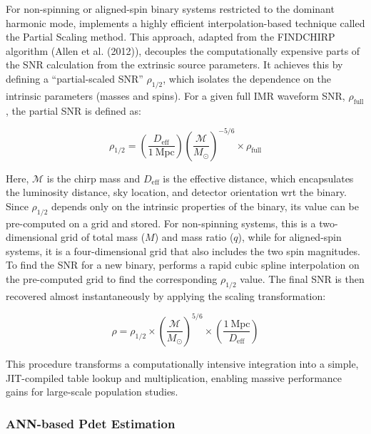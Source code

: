 \documentclass[10pt,a4paper,onecolumn]{article}
\let\textttOrig=\texttt
\def\texttt#1{\expandafter\textttOrig{\seqsplit{#1}}}
\begin{document}
For non-spinning or aligned-spin binary systems restricted to the
dominant harmonic mode, \texttt{gwsnr} implements a highly efficient
interpolation-based technique called the Partial Scaling method. This
approach, adapted from the FINDCHIRP algorithm (Allen et al. (2012)),
decouples the computationally expensive parts of the SNR calculation
from the extrinsic source parameters. It achieves this by defining a
``partial-scaled SNR'' \(\rho_{1/2}\), which isolates the dependence on
the intrinsic parameters (masses and spins). For a given full IMR
waveform SNR, \(\rho_{\text{full}}\), the partial SNR is defined as:

\[
\rho_{1/2} = \left(\frac{D_\mathrm{eff}}{1~\mathrm{Mpc}}\right) \left(\frac{\mathcal{M}}{M_\odot}\right)^{-5/6} \times \rho_{\text{full}}
\]

Here, \(\mathcal{M}\) is the chirp mass and \(D_{\text{eff}}\) is the
effective distance, which encapsulates the luminosity distance, sky
location, and detector orientation wrt the binary. Since \(\rho_{1/2}\)
depends only on the intrinsic properties of the binary, its value can be
pre-computed on a grid and stored. For non-spinning systems, this is a
two-dimensional grid of total mass (\(M\)) and mass ratio (\(q\)), while
for aligned-spin systems, it is a four-dimensional grid that also
includes the two spin magnitudes. To find the SNR for a new binary,
\texttt{gwsnr} performs a rapid cubic spline interpolation on the
pre-computed grid to find the corresponding \(\rho_{1/2}\) value. The
final SNR is then recovered almost instantaneously by applying the
scaling transformation:

\[
\rho = \rho_{1/2} \times \left(\frac{\mathcal{M}}{M_\odot}\right)^{5/6} \times \left(\frac{1~\mathrm{Mpc}}{D_\mathrm{eff}}\right)
\]

This procedure transforms a computationally intensive integration into a
simple, JIT-compiled table lookup and multiplication, enabling massive
performance gains for large-scale population studies.

\subsubsection{ANN-based Pdet
Estimation}\label{ann-based-pdet-estimation}
\end{document}
